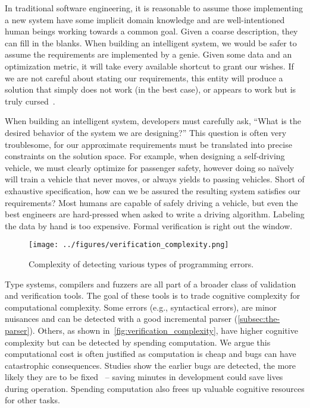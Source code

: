 In traditional software engineering, it is reasonable to assume those implementing a new system have some implicit domain knowledge and are well-intentioned human beings working towards a common goal. Given a coarse description, they can fill in the blanks. When building an intelligent system, we would be safer to assume the requirements are implemented by a genie. Given some data and an optimization metric, it will take every available shortcut to grant our wishes. If we are not careful about stating our requirements, this entity will produce a solution that simply does not work (in the best case), or appears to work but is truly cursed~\citep{bellman1957dynamic}.

When building an intelligent system, developers must carefully ask, ``What is the desired behavior of the system we are designing?'' This question is often very troublesome, for our approximate requirements must be translated into precise constraints on the solution space. For example, when designing a self-driving vehicle, we must clearly optimize for passenger safety, however doing so na\"ively will train a vehicle that never moves, or always yields to passing vehicles. Short of exhaustive specification, how can we be assured the resulting system satisfies our requirements? Most humans are capable of safely driving a vehicle, but even the best engineers are hard-pressed when asked to write a driving algorithm. Labeling the data by hand is too expensive. Formal verification is right out the window.

\begin{figure}
    \centering
    \texttt{[image: ../figures/verification\_complexity.png]}
    \caption{Complexity of detecting various types of programming errors.}
    \label{fig:verification_complexity}
\end{figure}

Type systems, compilers and fuzzers are all part of a broader class of validation and verification tools. The goal of these tools is to trade cognitive complexity for computational complexity. Some errors (e.g., syntactical errors), are minor nuisances and can be detected with a good incremental parser (\autoref{subsec:the-parser}). Others, as shown in~\autoref{fig:verification_complexity}, have higher cognitive complexity but can be detected by spending computation. We argue this computational cost is often justified as computation is cheap and bugs can have catastrophic consequences. Studies show the earlier bugs are detected, the more likely they are to be fixed~\citep{distefano2019scaling} -- saving minutes in development could save lives during operation. Spending computation also frees up valuable cognitive resources for other tasks.

